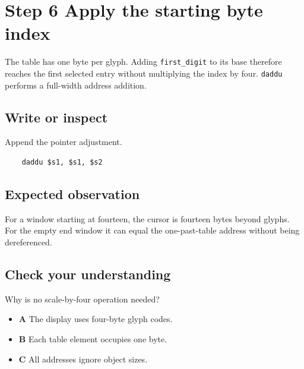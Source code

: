 \section{Step 6 Apply the starting byte
  index}\label{005-seven-segment-counter-s06-step-6-apply-the-starting-byte-index}

The table has one byte per glyph. Adding \texttt{first\_digit} to its
base therefore reaches the first selected entry without multiplying the
index by four. \texttt{daddu} performs a full-width address addition.

\subsection{Write or
  inspect}\label{005-seven-segment-counter-s06-write-or-inspect}

Append the pointer adjustment.

\begin{verbatim}
    daddu $s1, $s1, $s2
\end{verbatim}

\subsection{Expected
  observation}\label{005-seven-segment-counter-s06-expected-observation}

For a window starting at fourteen, the cursor is fourteen bytes beyond
glyphs. For the empty end window it can equal the one-past-table address
without being dereferenced.

\subsection{Check your
  understanding}\label{005-seven-segment-counter-s06-check-your-understanding}

Why is no scale-by-four operation needed?

\begin{itemize}
  \tightlist
  \item
        \textbf{A} The display uses four-byte glyph codes.
  \item
        \textbf{B} Each table element occupies one byte.
  \item
        \textbf{C} All addresses ignore object sizes.
\end{itemize}
